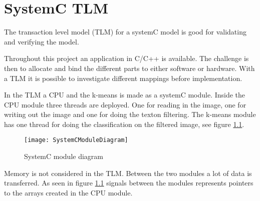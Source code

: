 \chapter{SystemC TLM}
The transaction level model (TLM) for a systemC model is good for validating and verifying the model. 

Throughout this project an application in C/C++ is available. The challenge is then to allocate and bind the different parts to either software or hardware. 
With a TLM it is possible to investigate different mappings before implementation. 

In the TLM a CPU and the k-means is made as a systemC module. Inside the CPU module three threads are deployed. One for reading in the image, one for writing out the image and one for doing the texton filtering. 
The k-means module has one thread for doing the classification on the filtered image, see figure \ref{fig:TLM}.

\begin{figure}[H]
\centering
\texttt{[image: SystemCModuleDiagram]}
\caption{SystemC module diagram}
\label{fig:TLM}
\end{figure}

Memory is not considered in the TLM. Between the two modules a lot of data is transferred. 
As seen in figure \ref{fig:TLM} signals between the modules represents pointers to the arrays created in the CPU module. 

